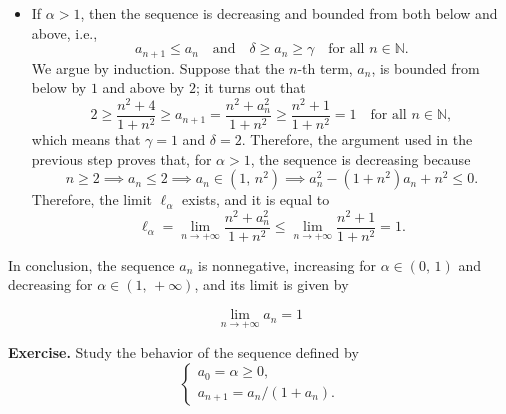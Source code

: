 \documentclass[a4paper,10 pt]{report}
\newcommand{\finalanswer}[1]{%
    \begin{finalAnswer}
    \[
        #1
    \]
    \end{finalAnswer}
}
\theoremstyle{definition}
\newcommand{\N}{\mathbb N}
\begin{document}
\begin{solutionBox}
\begin{itemize}
\item If $\alpha > 1$, then the sequence is decreasing and bounded from both below and above, i.e.,
\begin{equation*} a_{n + 1} \leq a_n \quad \text{and} \quad \delta \geq a_n \geq \gamma \quad \text{for all $n \in \N$}. \end{equation*}
We argue by induction. Suppose that the $n$-th term, $a_n$, is bounded from below by $1$ and above by $2$; it turns out that
\begin{equation*}2 \geq \frac{n^2 + 4}{1 + n^2} \geq a_{n + 1} = \frac{n^2 + a_n^2}{1 + n^2} \geq \frac{n^2 + 1}{1 + n^2} = 1 \quad \text{for all $n \in \N$}, \end{equation*}
which means that $\gamma = 1$ and $\delta = 2$. Therefore, the argument used in the previous step proves that, for $\alpha > 1$, the sequence is decreasing because
\begin{equation*}n \geq 2 \implies a_n \leq 2 \implies a_n \in (1, \, n^2) \implies a_n^2 - (1 + n^2) a_n + n^2 \leq 0. \end{equation*}
Therefore, the limit $\ell_\alpha$ exists, and it is equal to
\begin{equation*}\ell_\alpha = \lim_{n \to + \infty} \frac{n^2 + a_n^2}{1 + n^2} \leq \lim_{n \to + \infty} \frac{n^2 + 1}{1 + n^2} = 1. \end{equation*}
\end{itemize}

In conclusion, the sequence $a_n$ is nonnegative, increasing for $\alpha \in (0, \, 1)$ and decreasing for $\alpha \in (1, \, + \infty)$, and its limit is given by
 \finalanswer{\lim_{n \to + \infty} a_n =1}
\end{solutionBox}

\begin{exerciseBox} \textbf{Exercise.} Study the behavior of the sequence defined by
\begin{equation}\label{seq.3} \begin{cases} a_0 = \alpha \geq 0, \\ a_{n + 1} = a_n/(1+a_n). \end{cases} \end{equation}
\end{exerciseBox}
\end{document}
